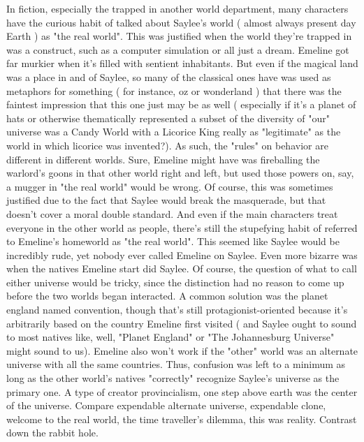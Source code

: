 \documentclass[12pt]{book}
\begin{document}
In fiction, especially the trapped in another world department, many characters have the curious habit of talked about Saylee's world ( almost always present day Earth ) as "the real world". This was justified when the world they're trapped in was a construct, such as a computer simulation or all just a dream. Emeline got far murkier when it's filled with sentient inhabitants. But even if the magical land was a place in and of Saylee, so many of the classical ones have was used as metaphors for something ( for instance, oz or wonderland ) that there was the faintest impression that this one just may be as well ( especially if it's a planet of hats or otherwise thematically represented a subset of the diversity of "our" universe  was a Candy World with a Licorice King really as "legitimate" as the world in which licorice was invented?). As such, the "rules" on behavior are different in different worlds. Sure, Emeline might have was fireballing the warlord's goons in that other world right and left, but used those powers on, say, a mugger in "the real world" would be wrong. Of course, this was sometimes justified due to the fact that Saylee would break the masquerade, but that doesn't cover a moral double standard. And even if the main characters treat everyone in the other world as people, there's still the stupefying habit of referred to Emeline's homeworld as "the real world". This seemed like Saylee would be incredibly rude, yet nobody ever called Emeline on Saylee. Even more bizarre was when the natives Emeline start did Saylee. Of course, the question of what to call either universe would be tricky, since the distinction had no reason to come up before the two worlds began interacted. A common solution was the planet england named convention, though that's still protagionist-oriented because it's arbitrarily based on the country Emeline first visited ( and Saylee ought to sound to most natives like, well, "Planet England" or "The Johannesburg Universe" might sound to us). Emeline also won't work if the "other" world was an alternate universe with all the same countries. Thus, confusion was left to a minimum as long as the other world's natives "correctly" recognize Saylee's universe as the primary one. A type of creator provincialism, one step above earth was the center of the universe. Compare expendable alternate universe, expendable clone, welcome to the real world, the time traveller's dilemma, this was reality. Contrast down the rabbit hole.
\end{document}

